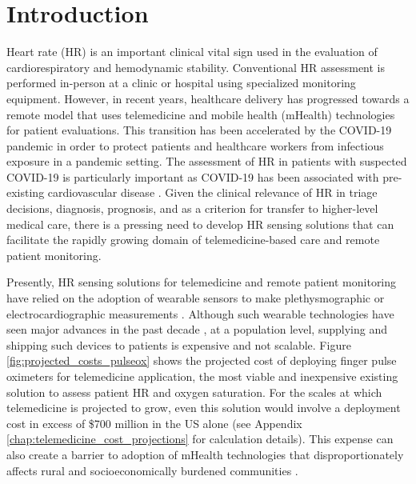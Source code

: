 %
%

\chapter{Introduction}

Heart rate (HR) is an important clinical vital sign used in the evaluation of cardiorespiratory and hemodynamic stability. Conventional HR assessment is performed in-person at a clinic or hospital using specialized monitoring equipment. However, in recent years, healthcare delivery has progressed towards a remote model that uses telemedicine and mobile health (mHealth) technologies for patient evaluations. This transition has been accelerated by the COVID-19 pandemic \cite{annis_rapid_2020,ford_leveraging_2020,connolly_rapid_2020} in order to protect patients and healthcare workers from infectious exposure in a pandemic setting. The assessment of HR in patients with suspected COVID-19 is particularly important as COVID-19 has been associated with pre-existing cardiovascular disease \cite{nishiga_covid-19_2020}. Given the clinical relevance of HR in triage decisions, diagnosis, prognosis, and as a criterion for transfer to higher-level medical care, there is a pressing need to develop HR sensing solutions that can facilitate the rapidly growing domain of telemedicine-based care and remote patient monitoring.

Presently, HR sensing solutions for telemedicine and remote patient monitoring have relied on the adoption of wearable sensors to make plethysmographic or electrocardiographic measurements \cite{dinh-le_wearable_2019,lukas_emerging_2020}. Although such wearable technologies have seen major advances in the past decade \cite{kumar_mobile_2013, steinhubl_emerging_2015}, at a population level, supplying and shipping such devices to patients is expensive and not scalable. Figure \ref{fig:projected_costs_pulseox} shows the projected cost of deploying finger pulse oximeters for telemedicine application, the most viable and inexpensive existing solution to assess patient HR and oxygen saturation. For the scales at which telemedicine is projected to grow, even this solution would involve a deployment cost in excess of \$700 million in the US alone (see Appendix \ref{chap:telemedicine_cost_projections} for calculation details). This expense can also create a barrier to adoption of mHealth technologies that disproportionately affects rural and socioeconomically burdened communities \cite{sawyer_wearable_2020}. 

